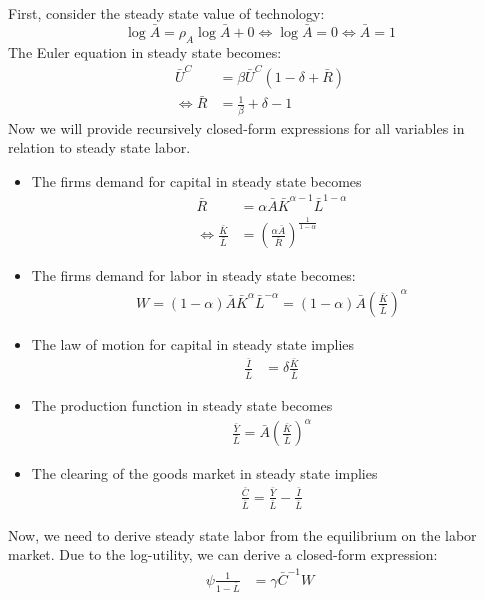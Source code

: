 \begin{Solution}{4}
		First, consider the steady state value of technology:
		$$\log\bar{A}=\rho_A \log\bar{A} + 0 \Leftrightarrow \log\bar{A} = 0 \Leftrightarrow \bar{A} = 1$$
		The Euler equation in steady state becomes:
		\begin{align*}
			\bar{U}^C &= \beta \bar{U}^C(1-\delta+\bar{R})\\
			\Leftrightarrow \bar{R} &= \frac{1}{\beta} + \delta - 1
		\end{align*}
		Now we will provide recursively closed-form expressions for all variables in relation to steady state labor.
		\begin{itemize}
		\item The firms demand for capital in steady state becomes
		\begin{align*}
			\bar{R} &= \alpha \bar{A} \bar{K}^{\alpha-1}\bar{L}^{1-\alpha}\\
			\Leftrightarrow \frac{\bar{K}}{\bar{L}} &= \left(\frac{\alpha \bar{A}}{\bar{R}}\right)^{\frac{1}{1-\alpha}}
		\end{align*}
		\item The firms demand for labor in steady state becomes:
		\begin{align*}
			W =(1-\alpha) \bar{A}\bar{K}^\alpha \bar{L}^{-\alpha} = (1-\alpha)\bar{A} \left(\frac{\bar{K}}{\bar{L}}\right)^\alpha
		\end{align*}
		\item The law of motion for capital in steady state implies
		\begin{align*}
			\frac{\bar{I}}{\bar{L}} &= \delta\frac{\bar{K}}{\bar{L}}
		\end{align*}
		\item The production function in steady state becomes
		\begin{align*}
			\frac{\bar{Y}}{\bar{L}} = \bar{A} \left(\frac{\bar{K}}{\bar{L}}\right)^\alpha
		\end{align*}
		\item The clearing of the goods market in steady state implies
		\begin{align*}
		\frac{\bar{C}}{\bar{L}} = \frac{\bar{Y}}{\bar{L}} - \frac{\bar{I}}{\bar{L}}
		\end{align*}
		\end{itemize}
		Now, we need to derive steady state labor from the equilibrium on the labor market. Due to the log-utility, we can derive a closed-form expression:
		\begin{align*}
			\psi \frac{1}{1-\bar{L}} &= \gamma \bar{C}^{-1} W\\

\end{align*}
\end{Solution}
